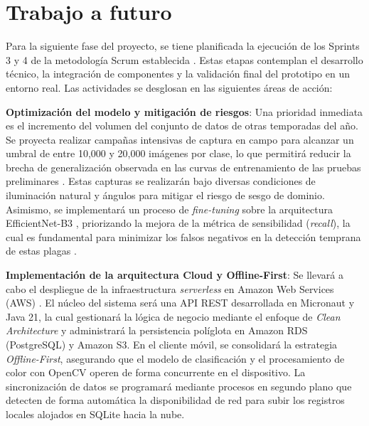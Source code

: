 \newpage

\section{Trabajo a futuro}

Para la siguiente fase del proyecto, se tiene planificada la ejecución de los Sprints 3 y 4 de la metodología Scrum establecida \cite{sutherland2020scrum}. Estas etapas contemplan el desarrollo técnico, la integración de componentes y la validación final del prototipo en un entorno real. Las actividades se desglosan en las siguientes áreas de acción:

    \textbf{Optimización del modelo y mitigación de riesgos}: Una prioridad inmediata es el incremento del volumen del conjunto de datos de otras temporadas del año. Se proyecta realizar campañas intensivas de captura en campo para alcanzar un umbral de entre 10,000 y 20,000 imágenes por clase, lo que permitirá reducir la brecha de generalización observada en las curvas de entrenamiento de las pruebas preliminares \cite{goodfellow2016deep}. Estas capturas se realizarán bajo diversas condiciones de iluminación natural y ángulos para mitigar el riesgo de sesgo de dominio. Asimismo, se implementará un proceso de \textit{fine-tuning} sobre la arquitectura EfficientNet-B3 \cite{Tan2019EfficientNetRM}, priorizando la mejora de la métrica de sensibilidad (\textit{recall}), la cual es fundamental para minimizar los falsos negativos en la detección temprana de estas plagas \cite{forestal2025insectos}.

    \textbf{Implementación de la arquitectura Cloud y Offline-First}: Se llevará a cabo el despliegue de la infraestructura \textit{serverless} en Amazon Web Services (AWS) \cite{cloudplexo_serverless, northflank_comparison}. El núcleo del sistema será una API REST desarrollada en Micronaut y Java 21, la cual gestionará la lógica de negocio mediante el enfoque de \textit{Clean Architecture} y administrará la persistencia políglota en Amazon RDS (PostgreSQL) \cite{aws_rds_pricing} y Amazon S3. En el cliente móvil, se consolidará la estrategia \textit{Offline-First}, asegurando que el modelo de clasificación \cite{omahony2019deep_learning_vs_traditional_cv} y el procesamiento de color con OpenCV operen de forma concurrente en el dispositivo. La sincronización de datos se programará mediante procesos en segundo plano que detecten de forma automática la disponibilidad de red para subir los registros locales alojados en SQLite hacia la nube.

